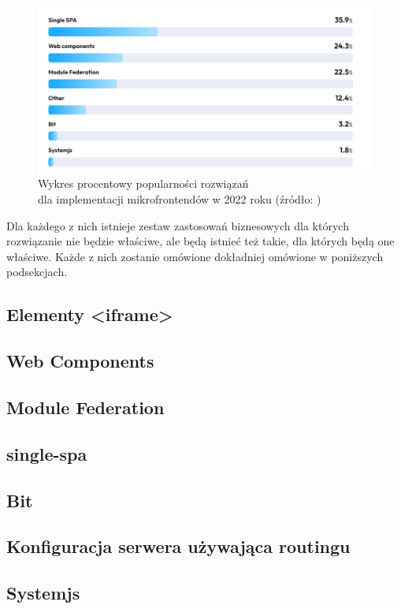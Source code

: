 \documentclass{SGGW-thesis}
\begin{document}
  \begin{figure}[h]
    \centering
    \captionsetup{justification=centering}
    \includegraphics[width=\textwidth]{frontend_implementations_by_percent.png}
    \caption{Wykres procentowy popularności rozwiązań \\ dla implementacji mikrofrontendów w 2022 roku (źródło: \cite{tsh_2022})}
    \label{fig:tsh_frontend_implementations}
  \end{figure}

  Dla każdego z nich istnieje zestaw zastosowań biznesowych dla których rozwiązanie nie będzie właściwe, ale będą istnieć też takie, dla których będą one właściwe. Każde z nich zostanie omówione dokładniej omówione w poniższych podsekcjach. 
    \subsection{Elementy <iframe>}
    \subsection{Web Components}
    \subsection{Module Federation}
    \subsection{single-spa}
    \subsection{Bit}
    \subsection{Konfiguracja serwera używająca routingu}
    \subsection{Systemjs}
\end{document}
